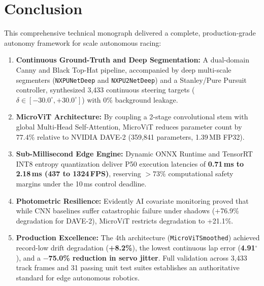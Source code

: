 \documentclass[10pt,journal,compsoc]{IEEEtran}
\begin{document}
\section{Conclusion}
\label{sec:conclusion}

This comprehensive technical monograph delivered a complete, production-grade autonomy framework for scale autonomous racing:
\begin{enumerate}
    \item \textbf{Continuous Ground-Truth and Deep Segmentation:} A dual-domain Canny and Black Top-Hat pipeline, accompanied by deep multi-scale segmenters (\texttt{NXPUNetDeep} and \texttt{NXPU2NetDeep}) and a Stanley/Pure Pursuit controller, synthesized 3,433 continuous steering targets ($\delta \in [-30.0^\circ, +30.0^\circ]$) with 0\% background leakage.
    \item \textbf{MicroViT Architecture:} By coupling a 2-stage convolutional stem with global Multi-Head Self-Attention, MicroViT reduces parameter count by $77.4\%$ relative to NVIDIA DAVE-2 (359,841 parameters, 1.39\,MB FP32).
    \item \textbf{Sub-Millisecond Edge Engine:} Dynamic ONNX Runtime and TensorRT INT8 entropy quantization deliver P50 execution latencies of \textbf{0.71\,ms to 2.18\,ms (437 to 1324\,FPS)}, reserving $>73\%$ computational safety margins under the 10\,ms control deadline.
    \item \textbf{Photometric Resilience:} Evidently AI covariate monitoring proved that while CNN baselines suffer catastrophic failure under shadows (+76.9\% degradation for DAVE-2), MicroViT restricts degradation to +21.1\%.
    \item \textbf{Production Excellence:} The 4th architecture (\texttt{MicroViTSmoothed}) achieved record-low drift degradation (\textbf{+8.2\%}), the lowest continuous lap error (\textbf{4.91$^\circ$}), and a \textbf{$-$75.0\% reduction in servo jitter}. Full validation across 3,433 track frames and 31 passing unit test suites establishes an authoritative standard for edge autonomous robotics.
\end{enumerate}
\end{document}

